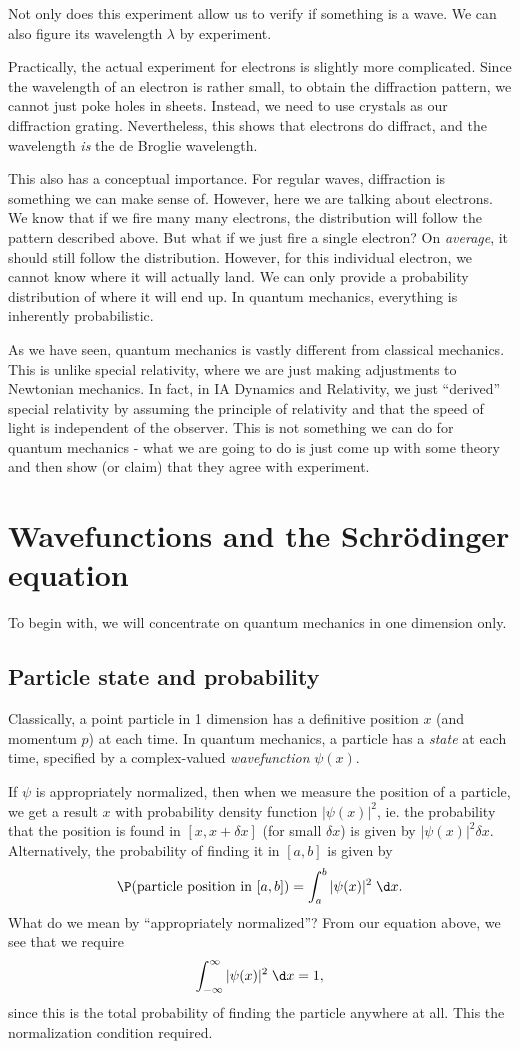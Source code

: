 \documentclass[a4paper]{article}
\begin{document}
Not only does this experiment allow us to verify if something is a wave. We can also figure its wavelength $\lambda$ by experiment.

Practically, the actual experiment for electrons is slightly more complicated. Since the wavelength of an electron is rather small, to obtain the diffraction pattern, we cannot just poke holes in sheets. Instead, we need to use crystals as our diffraction grating. Nevertheless, this shows that electrons do diffract, and the wavelength \emph{is} the de Broglie wavelength.

This also has a conceptual importance. For regular waves, diffraction is something we can make sense of. However, here we are talking about electrons. We know that if we fire many many electrons, the distribution will follow the pattern described above. But what if we just fire a single electron? On \emph{average}, it should still follow the distribution. However, for this individual electron, we cannot know where it will actually land. We can only provide a probability distribution of where it will end up. In quantum mechanics, everything is inherently probabilistic.

As we have seen, quantum mechanics is vastly different from classical mechanics. This is unlike special relativity, where we are just making adjustments to Newtonian mechanics. In fact, in IA Dynamics and Relativity, we just ``derived'' special relativity by assuming the principle of relativity and that the speed of light is independent of the observer. This is not something we can do for quantum mechanics - what we are going to do is just come up with some theory and then show (or claim) that they agree with experiment.

\section{Wavefunctions and the Schr\"odinger equation}
To begin with, we will concentrate on quantum mechanics in one dimension only.

\subsection{Particle state and probability}
Classically, a point particle in 1 dimension has a definitive position $x$ (and momentum $p$) at each time. In quantum mechanics, a particle has a \emph{state} at each time, specified by a complex-valued \emph{wavefunction} $\psi(x)$.

If $\psi$ is appropriately normalized, then when we measure the position of a particle, we get a result $x$ with probability density function $|\psi(x)|^2$, ie. the probability that the position is found in $[x, x + \delta x]$ (for small $\delta x$) is given by $|\psi(x)|^2 \delta x$. Alternatively, the probability of finding it in $[a, b]$ is given by
\[
  \P(\text{particle position in }[a, b]) = \int_a^b |\psi(x)|^2 \;\d x.
\]
What do we mean by ``appropriately normalized''? From our equation above, we see that we require
\[
  \int_{-\infty}^\infty |\psi(x)|^2\;\d x = 1,
\]
since this is the total probability of finding the particle anywhere at all. This the normalization condition required.
\end{document}
